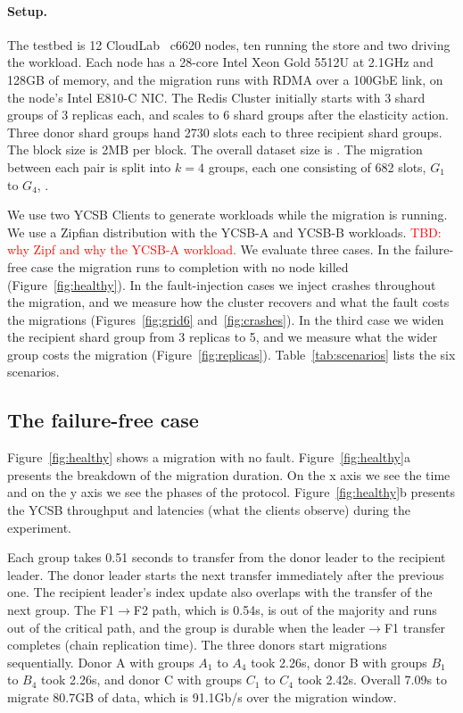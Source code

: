 \paragraph{Setup.}
\label{sec:eval-setup}
The testbed is 12 CloudLab~\cite{cloudlab} c6620 nodes, ten running the store and two driving the workload.
Each node has a 28-core Intel Xeon Gold 5512U at 2.1GHz and 128GB of memory, and the migration runs with RDMA over a 100GbE link, on the node's Intel E810-C NIC.
The Redis Cluster initially starts with 3 shard groups of 3 replicas each, and scales to 6 shard groups after the elasticity action. Three donor shard groups hand 2730 slots each to three recipient shard groups. The block size is 2MB per block. The overall dataset size is .
The migration between each pair is split into $k = 4$ groups, each one consisting of 682 slots, $G_1$ to $G_4$, .

We use two YCSB Clients to generate workloads while the migration is running.
We use a Zipfian distribution with the YCSB-A and YCSB-B workloads.
\textcolor{red}{TBD: why Zipf and why the YCSB-A workload.}
We evaluate three cases.
In the failure-free case the migration runs to completion with no node killed (Figure~\ref{fig:healthy}).
In the fault-injection cases we inject crashes throughout the migration, and we measure how the cluster recovers and what the fault costs the migrations (Figures~\ref{fig:grid6} and~\ref{fig:crashes}).
In the third case we widen the recipient shard group from 3 replicas to 5, and we measure what the wider group costs the migration (Figure~\ref{fig:replicas}).
Table~\ref{tab:scenarios} lists the six scenarios.

\subsection{The failure-free case}
\label{sec:eval-healthy}

Figure~\ref{fig:healthy} shows a migration with no fault.
Figure~\ref{fig:healthy}a presents the breakdown of the migration duration.
On the x axis we see the time and on the y axis we see the phases of the protocol.
Figure~\ref{fig:healthy}b presents the YCSB throughput and latencies (what the clients observe) during the experiment.

Each group takes 0.51 seconds to transfer from the donor leader to the recipient leader.
The donor leader starts the next transfer immediately after the previous one.
The recipient leader's index update also overlaps with the transfer of the next group.
The F1$\rightarrow$F2 path, which is 0.54s, is out of the majority and runs out of the critical path, and the group is durable when the leader$\rightarrow$F1 transfer completes (chain replication time).
The three donors start migrations sequentially.
Donor A with groups $A_1$ to $A_4$ took 2.26s, donor B with groups $B_1$ to $B_4$ took 2.26s, and donor C with groups $C_1$ to $C_4$ took 2.42s.
Overall 7.09s to migrate 80.7GB of data, which is 91.1Gb/s over the migration window.

